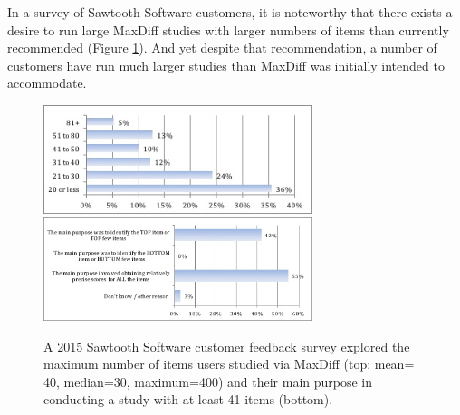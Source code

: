 \documentclass[nonblindrev]{informs3}
\begin{document}
\begin{APPENDICES}
In a survey of Sawtooth Software customers, it is noteworthy that there exists a desire to run large MaxDiff studies with larger numbers of items than currently recommended (Figure \ref{fig:max_and_purpose}). And yet despite that recommendation, a number of customers have run much larger studies than MaxDiff was initially intended to accommodate. 
\begin{figure}
\caption{A 2015 Sawtooth Software customer feedback survey explored the maximum number of items users studied via MaxDiff (top: mean= 40, median=30, maximum=400) and their main purpose in conducting a study with at least 41 items (bottom). } 
\label{fig:max_and_purpose}
\begin{center} 
\includegraphics[width=0.7\textwidth]{plots/maxnumstudy}
\includegraphics[width=0.7\textwidth]{plots/maxdiffpurpose}
\end{center}
\end{figure}


\end{APPENDICES}
\end{document}
